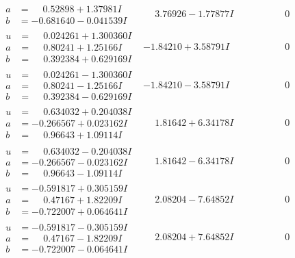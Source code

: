 \documentclass[1p]{elsarticle_modified}
\theoremstyle{definition}
\begin{document}
$$\begin{array}{c|c|c}
\begin{aligned}
a &= \phantom{-}0.52898 + 1.37981 I \\
b &= -0.681640 - 0.041539 I\end{aligned}
 & \phantom{-}3.76926 - 1.77877 I & \phantom{-0.000000 } 0 \\ \hline\begin{aligned}
u &= \phantom{-}0.024261 + 1.300360 I \\
a &= \phantom{-}0.80241 + 1.25166 I \\
b &= \phantom{-}0.392384 + 0.629169 I\end{aligned}
 & -1.84210 + 3.58791 I & \phantom{-0.000000 } 0 \\ \hline\begin{aligned}
u &= \phantom{-}0.024261 - 1.300360 I \\
a &= \phantom{-}0.80241 - 1.25166 I \\
b &= \phantom{-}0.392384 - 0.629169 I\end{aligned}
 & -1.84210 - 3.58791 I & \phantom{-0.000000 } 0 \\ \hline\begin{aligned}
u &= \phantom{-}0.634032 + 0.204038 I \\
a &= -0.266567 + 0.023162 I \\
b &= \phantom{-}0.96643 + 1.09114 I\end{aligned}
 & \phantom{-}1.81642 + 6.34178 I & \phantom{-0.000000 } 0 \\ \hline\begin{aligned}
u &= \phantom{-}0.634032 - 0.204038 I \\
a &= -0.266567 - 0.023162 I \\
b &= \phantom{-}0.96643 - 1.09114 I\end{aligned}
 & \phantom{-}1.81642 - 6.34178 I & \phantom{-0.000000 } 0 \\ \hline\begin{aligned}
u &= -0.591817 + 0.305159 I \\
a &= \phantom{-}0.47167 + 1.82209 I \\
b &= -0.722007 + 0.064641 I\end{aligned}
 & \phantom{-}2.08204 - 7.64852 I & \phantom{-0.000000 } 0 \\ \hline\begin{aligned}
u &= -0.591817 - 0.305159 I \\
a &= \phantom{-}0.47167 - 1.82209 I \\
b &= -0.722007 - 0.064641 I\end{aligned}
 & \phantom{-}2.08204 + 7.64852 I & \phantom{-0.000000 } 0 \\ \hline\begin{aligned}

\end{aligned}
\end{array}$$
\end{document}
